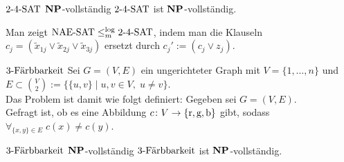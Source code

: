 \begin{Satz}{$\kSAT{2\text{-}4}$ $\NP$-vollständig}
    $\kSAT{2\text{-}4}$ ist $\NP$-vollständig.
\end{Satz}

\begin{Beweis}
    Man zeigt $\NAESAT \le_m^{\log} \kSAT{2\text{-}4}$, indem man die Klauseln
    $c_j = (\widetilde{x}_{1j} \lor \widetilde{x}_{2j} \lor \widetilde{x}_{3j})$
    ersetzt durch $c_j' := (c_j \lor z_j)$.
\end{Beweis}

\linie
\pagebreak

\begin{Def}{$\kFaerbbarkeit{3}$}
    Sei $G = (V, E)$ ein ungerichteter Graph mit $V = \{1, \dotsc, n\}$ und\\
    $E \subset \binom{V}{2} := \{\{u, v\} \;|\; u, v \in V,\; u \not= v\}$.\\
    Das Problem  ist damit wie folgt definiert:
    Gegeben sei $G = (V, E)$.\\
    Gefragt ist, ob es eine Abbildung $c\colon V \rightarrow \{\red, \green, \blue\}$ gibt,
    sodass $\forall_{\{x, y\} \in E}\; c(x) \not= c(y)$.
\end{Def}

\begin{Satz}{$\kFaerbbarkeit{3}$ $\NP$-vollständig}
    $\kFaerbbarkeit{3}$ ist $\NP$-vollständig.
\end{Satz}


